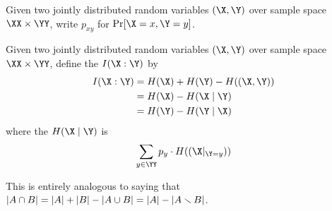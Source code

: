 \documentclass[class=co432,notes,tikz]{agony}
\begin{document}
\begin{notation}
  Given two jointly distributed random variables $(\X,\Y)$ over sample space
  $\XX \times \YY$, write $p_{xy}$ for $\Pr[\X = x, \Y = y]$.
\end{notation}
\begin{defn}
  Given two jointly distributed random variables $(\X,\Y)$ over sample space
  $\XX \times \YY$, define the  $I(\X : \Y)$ by
  \begin{align*}
    I(\X : \Y) & = H(\X) + H(\Y) - H((\X,\Y)) \\
               & = H(\X) - H(\X \mid \Y)      \\
               & = H(\Y) - H(\Y \mid \X)
  \end{align*}
  where the  $H(\X \mid \Y)$ is
  \[ \sum_{y \in \YY} p_y \cdot H((\X|_{\Y=y})) \]
\end{defn}
This is entirely analogous to saying that
$\abs{A \cap B} = \abs{A} + \abs{B} - \abs{A \cup B} = \abs{A} - \abs{A \smallsetminus B}$.
\end{document}

